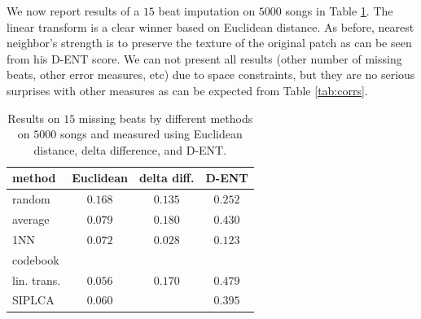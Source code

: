 \documentclass{article}
\begin{document}
We now report results of a $15$ beat imputation on $5000$ songs in
Table \ref{tab:res}. The linear transform is a clear winner based on
Euclidean distance. As before, nearest neighbor's strength is to
preserve the texture of the original patch as can be seen from his
D-ENT score. We can not present all results (other number of missing
beats, other error measures, etc) due to space constraints, but they
are no serious surprises with other measures as can be expected from
Table \ref{tab:corrs}.

\begin{table}[t]
\begin{small}
\begin{center}
\begin{tabular}{|l||c|c|c|} \hline
method & Euclidean & delta diff. & D-ENT \\ \hline
random & $0.168$ & $0.135$ & $0.252$ \\
average & $0.079$ & $0.180$ & $0.430$ \\ \hline
1NN & $0.072$ & $\mathbf{0.028}$ & $\mathbf{0.123}$ \\
codebook & & & \\ \hline
lin. trans. & $\mathbf{0.056}$ & $0.170$ & $0.479$ \\
SIPLCA & $0.060$ &  & $0.395$ \\ \hline
\end{tabular}
\caption{Results on $15$ missing beats by different methods
on $5000$ songs and measured using Euclidean distance, delta
difference, and D-ENT.
\label{tab:res}}
\end{center}
\end{small}
\end{table}
\end{document}
